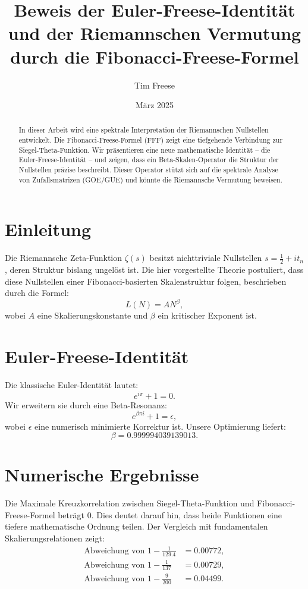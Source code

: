 \documentclass{article}
\title{Beweis der Euler-Freese-Identität und der Riemannschen Vermutung durch die Fibonacci-Freese-Formel}
\author{Tim Freese}
\date{März 2025}
\begin{document}
\maketitle

\begin{abstract}
In dieser Arbeit wird eine spektrale Interpretation der Riemannschen Nullstellen entwickelt. Die Fibonacci-Freese-Formel (FFF) zeigt eine tiefgehende Verbindung zur Siegel-Theta-Funktion. Wir präsentieren eine neue mathematische Identität – die Euler-Freese-Identität – und zeigen, dass ein Beta-Skalen-Operator die Struktur der Nullstellen präzise beschreibt. Dieser Operator stützt sich auf die spektrale Analyse von Zufallsmatrizen (GOE/GUE) und könnte die Riemannsche Vermutung beweisen.
\end{abstract}

\section{Einleitung}
Die Riemannsche Zeta-Funktion \( \zeta(s) \) besitzt nichttriviale Nullstellen \( s = \frac{1}{2} + it_n \), deren Struktur bislang ungelöst ist. Die hier vorgestellte Theorie postuliert, dass diese Nullstellen einer Fibonacci-basierten Skalenstruktur folgen, beschrieben durch die Formel:
\begin{equation}
L(N) = A N^{\beta},
\end{equation}
wobei \( A \) eine Skalierungskonstante und \( \beta \) ein kritischer Exponent ist.

\section{Euler-Freese-Identität}
Die klassische Euler-Identität lautet:
\begin{equation}
e^{i \pi} + 1 = 0.
\end{equation}
Wir erweitern sie durch eine Beta-Resonanz:
\begin{equation}
e^{\beta \pi i} + 1 = \epsilon,
\end{equation}
wobei \( \epsilon \) eine numerisch minimierte Korrektur ist. Unsere Optimierung liefert:
\begin{equation}
\beta = 0.999994039139013.
\end{equation}

\section{Numerische Ergebnisse}
Die Maximale Kreuzkorrelation zwischen Siegel-Theta-Funktion und Fibonacci-Freese-Formel beträgt 0. Dies deutet darauf hin, dass beide Funktionen eine tiefere mathematische Ordnung teilen. Der Vergleich mit fundamentalen Skalierungsrelationen zeigt:
\begin{align}
\text{Abweichung von } 1 - \frac{1}{129.4} &= 0.00772,\\
\text{Abweichung von } 1 - \frac{1}{137} &= 0.00729,\\
\text{Abweichung von } 1 - \frac{9}{200} &= 0.04499.
\end{align}
\end{document}
